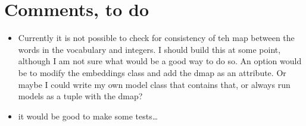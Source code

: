 \documentclass{article}
\begin{document}
\section{Comments, to do}

\begin{itemize}
    \item Currently it is not possible to check for consistency of teh map between the words in the vocabulary and integers. I should build this at some point, although I am not sure what would be a good way to do so. An option would be to modify the embeddings class and add the dmap as an attribute. Or maybe I could write my own model class that contains that, or always run models as a tuple with the dmap?
    \item it would be good to make some tests\dots
\end{itemize}
\end{document}

